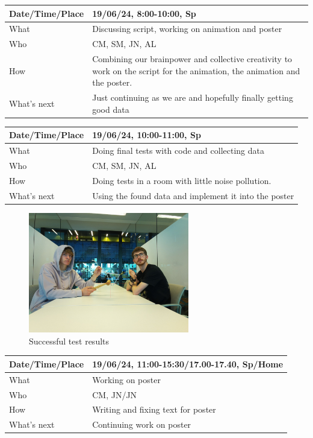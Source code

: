 \documentclass{article}
\begin{document}
\begin{table}[H]
\begin{tabular}{|p{1.5in}|p{4in}|}
\hline
Date/Time/Place & 19/06/24, 8:00-10:00, Sp \\ \hline
What            & Discussing script, working on animation and poster \\ \hline
Who             & CM, SM, JN, AL \\ \hline
How             & Combining our brainpower and collective creativity to work on the script for the animation, the animation and the poster. \\ \hline
What's next     & Just continuing as we are and hopefully finally getting good data  \\ \hline
\end{tabular}
\end{table}

\begin{table}[H]
\begin{tabular}{|p{1.5in}|p{4in}|}
\hline
Date/Time/Place & 19/06/24, 10:00-11:00, Sp \\ \hline
What            & Doing final tests with code and collecting data \\ \hline
Who             & CM, SM, JN, AL \\ \hline
How             & Doing tests in a room with little noise pollution.  \\ \hline
What's next     & Using the found data and implement it into the poster \\ \hline
\end{tabular}
\end{table}

\begin{figure}[H]
    \centering
    \includegraphics[width=7cm]{finalpicture.png}
    \caption{Successful test results}   
\end{figure}

\begin{table}[H]
\begin{tabular}{|p{1.5in}|p{4in}|}
\hline
Date/Time/Place & 19/06/24, 11:00-15:30/17.00-17.40, Sp/Home \\ \hline
What            & Working on poster \\ \hline
Who             & CM, JN/JN \\ \hline
How             & Writing and fixing text for poster \\ \hline
What's next     & Continuing work on poster \\ \hline
\end{tabular}
\end{table}
\end{document}
